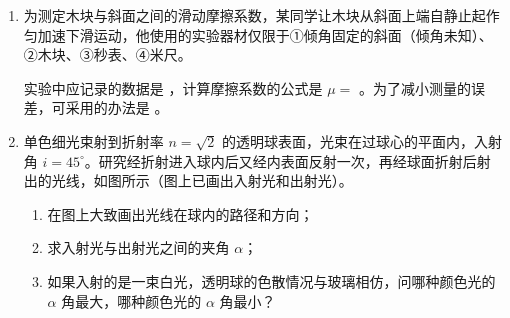 \documentclass[\gkver]{gaokaozhenti}
\begin{document}
\begin{enumerate}

\item
为测定木块与斜面之间的滑动摩擦系数，某同学让木块从斜面上端自静止起作匀加速下滑运动，他使用的实验器材仅限于①倾角固定的斜面（倾角未知）、②木块、③秒表、④米尺。

实验中应记录的数据是 ，计算摩擦系数的公式是 $\mu =$ 。为了减小测量的误差，可采用的办法是 。
\onepicture[align=right, w=5.5cm]{}


\item
单色细光束射到折射率 $n = \sqrt{2}$ 的透明球表面，光束在过球心的平面内，入射角 $i = 45^{\circ}$。研究经折射进入球内后又经内表面反射一次，再经球面折射后射出的光线，如图所示（图上已画出入射光和出射光）。
\begin{enumerate}
	\item
	在图上大致画出光线在球内的路径和方向；
	\item
	求入射光与出射光之间的夹角 $\alpha$；
	\item
	如果入射的是一束白光，透明球的色散情况与玻璃相仿，问哪种颜色光的 $\alpha$ 角最大，哪种颜色光的 $\alpha$ 角最小？
\end{enumerate}
\onepicture[align=right, w=5cm]{}

\end{enumerate}
\end{document}
